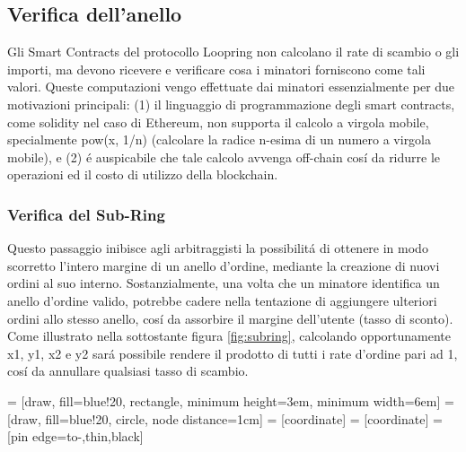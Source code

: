 \documentclass[UTF8,nofonts]{article}
\makeatletter
\newenvironment{figurehere}
 {\def\@captype{figure}}
 {}
\makeatother
\begin{document}
\begin{multicols}{2}
\subsection{Verifica dell'anello\label{sec:ring_verification}}

Gli Smart  Contracts  del protocollo Loopring non calcolano il rate di scambio o gli  importi, ma devono ricevere e verificare cosa i minatori forniscono come tali valori. Queste computazioni vengo effettuate dai minatori essenzialmente per due motivazioni principali: (1) il linguaggio di programmazione degli smart contracts, come solidity\cite{dannen2017introducing} nel caso di Ethereum, non supporta il calcolo a virgola mobile, specialmente  pow(x, 1/n)  (calcolare la radice n-esima di un numero a  virgola mobile),  e  (2)  \'e auspicabile che tale calcolo avvenga off-chain cos\'i da ridurre le operazioni ed il costo di utilizzo della blockchain.


\subsubsection{Verifica del Sub-Ring\label{sec:sub_ring_check}}
Questo passaggio inibisce agli arbitraggisti la possibilit\'a di ottenere in modo scorretto l'intero margine di un anello d'ordine, mediante la creazione di nuovi ordini al suo interno. Sostanzialmente, una volta che un minatore identifica un anello d'ordine valido, potrebbe cadere nella tentazione di aggiungere ulteriori ordini allo stesso anello, cos\'i da assorbire il margine dell'utente (tasso di sconto). Come illustrato nella sottostante figura \ref{fig:subring}, calcolando opportunamente x1, y1, x2 e y2 sar\'a possibile rendere il prodotto di tutti i rate d'ordine pari ad 1, cos\'i da annullare qualsiasi tasso di scambio.

\begin{center}
\begin{figurehere}
\centering
{} = [draw, fill=blue!20, rectangle,
    minimum height=3em, minimum width=6em]
 = [draw, fill=blue!20, circle, node distance=1cm]
 = [coordinate]
 = [coordinate]
 = [pin edge={to-,thin,black}]

\begin{tikzpicture}[
    auto,
    node distance=2cm,
    >=latex',
    font=\bfseries\footnotesize\sffamily,
    order/.style={
		scale=0.7,
		rectangle,
		rounded corners,
		draw=black,
		text centered,
		minimum height=12mm,
		fill=white
	},
	label/.style={
		scale=0.7
	}
  ]


\end{tikzpicture}
\end{figurehere}
\end{center}
\end{multicols}
\end{document}
